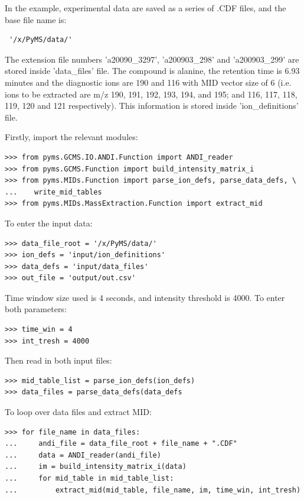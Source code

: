 In the example, experimental data are saved as a series of .CDF files, and the
base file name is:

\begin{verbatim}
 '/x/PyMS/data/'
\end{verbatim}

The extension file numbers 'a20090\_3297', 'a200903\_298' and 'a200903\_299' are
stored inside 'data\_files' file. The compound is alanine, the retention time
is 6.93 minutes and the diagnostic ions are 190 and 116 with MID vector size of
6 (i.e. ions to be extracted are m/z 190, 191, 192, 193, 194, and 195; and 116,
117, 118, 119, 120 and 121 respectively). This information is stored inside
'ion\_definitions' file.

Firstly, import the relevant modules:

\begin{verbatim}
>>> from pyms.GCMS.IO.ANDI.Function import ANDI_reader
>>> from pyms.GCMS.Function import build_intensity_matrix_i
>>> from pyms.MIDs.Function import parse_ion_defs, parse_data_defs, \
...    write_mid_tables
>>> from pyms.MIDs.MassExtraction.Function import extract_mid
\end{verbatim}

To enter the input data:

\begin{verbatim}
>>> data_file_root = '/x/PyMS/data/'
>>> ion_defs = 'input/ion_definitions'
>>> data_defs = 'input/data_files'
>>> out_file = 'output/out.csv'
\end{verbatim}

Time window size used is 4 seconds, and intensity threshold is 4000. To enter 
both parameters:

\begin{verbatim} 
>>> time_win = 4 
>>> int_tresh = 4000 
\end{verbatim}

Then read in both input files:

\begin{verbatim}
>>> mid_table_list = parse_ion_defs(ion_defs)
>>> data_files = parse_data_defs(data_defs
\end{verbatim}

To loop over data files and extract MID:

\begin{verbatim}
>>> for file_name in data_files:
...     andi_file = data_file_root + file_name + ".CDF"
...     data = ANDI_reader(andi_file)
...     im = build_intensity_matrix_i(data)
...     for mid_table in mid_table_list:
...         extract_mid(mid_table, file_name, im, time_win, int_tresh)
\end{verbatim}

